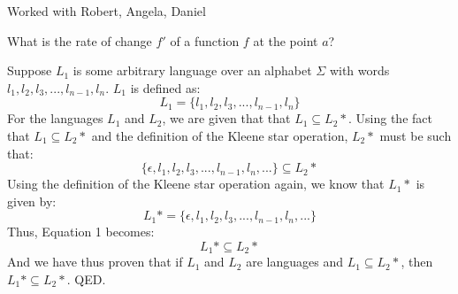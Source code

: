 \documentclass[11pt,letterpaper,boxed]{hmcpset}
\begin{document}
Worked with Robert, Angela, Daniel\\
\begin{problem}[1]
What is the rate of change $f'$ of a function $f$ at the point $a$?
\end{problem}
\begin{solution}
Suppose $L_1$ is some arbitrary language over an alphabet $\Sigma$ with words $l_1,l_2,l_3,...,l_{n-1},l_{n}$. $L_1$ is defined as:
$$ L_1 = \{l_1, l_2, l_3,...,l_{n-1}, l_{n}\} $$
For the languages $L_1$ and $L_2$, we are given that that $L_1 \subseteq L_2*$. Using the fact that $L_1 \subseteq L_2*$ and the definition of the Kleene star operation, $L_2*$ must be such that:
$$ \{\epsilon, l_1, l_2, l_3,...,l_{n-1}, l_{n},...\} \subseteq L_2* $$
Using the definition of the Kleene star operation again, we know that $L_1*$ is given by:
$$ L_1* =  \{\epsilon, l_1, l_2, l_3,...,l_{n-1}, l_{n},...\} $$
Thus, Equation 1 becomes:
$$ L_1* \subseteq L_2* $$
And we have thus proven that if $L_1$ and $L_2$ are languages and $L_1 \subseteq L_2*$, then $L_1 * \subseteq L_2*$. QED.
\end{solution}
\end{document}
